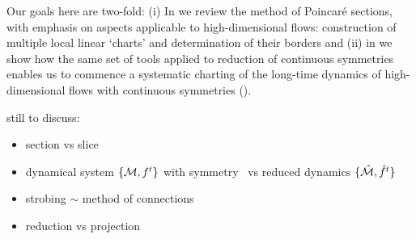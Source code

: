 Our goals here are two-fold:
(i) In  we review the method of Poincar\'e sections, with
    emphasis on aspects applicable to high-dimensional flows: construction of
    multiple local linear `charts' and determination of their borders and
(ii) in  we show how the same set of tools applied to
    reduction of continuous symmetries enables us to commence a
    systematic charting of the long-time dynamics of high-dimensional
    flows with continuous symmetries ().

    \ifdraft\color{blue}
still to discuss:
\begin{itemize}

  \item section {\PoincS} vs slice \pSRed

  \item
dynamical system $\{{\cal M},f^t\}$ with symmetry \Group\ vs reduced dynamics
$\{\hat{\cal M},\hat{f}^t\}$
  \item strobing $\sim$ method of connections
  \item reduction vs projection
\end{itemize}
    \color{black}\fi
